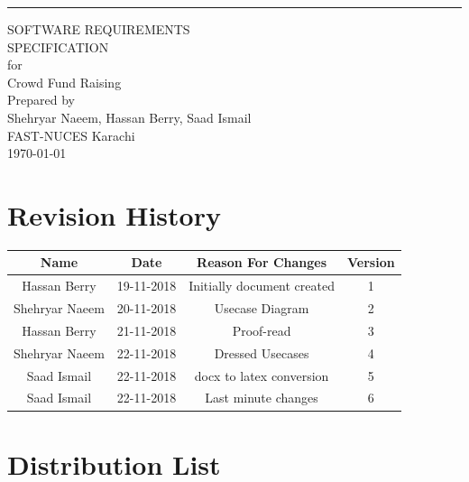 \documentclass{scrreprt}
\date{}
\begin{document}
\begin{flushright}
    \rule{16cm}{5pt}\vskip1cm
    \begin{bfseries}
        \Huge{SOFTWARE REQUIREMENTS\\ SPECIFICATION}\\
        \vspace{1.9cm}
        for\\
        \vspace{1.9cm}
        Crowd Fund Raising\\
        \vspace{1.9cm}
        Prepared by\\Shehryar Naeem, Hassan Berry, Saad Ismail\\
        \vspace{1.9cm}
        FAST-NUCES Karachi\\
        \vspace{1.9cm}
        \today\\
    \end{bfseries}
\end{flushright}

\tableofcontents


\chapter*{Revision History}

\begin{center}
    \begin{tabular}{|c|c|c|c|}
        \hline
	    Name & Date & Reason For Changes & Version\\
        \hline
	    Hassan Berry & 19-11-2018 & Initially document created & 1\\
        \hline
	    Shehryar Naeem & 20-11-2018 & Usecase Diagram & 2\\
        \hline
        Hassan Berry & 21-11-2018 & Proof-read & 3\\
        \hline
        Shehryar Naeem & 22-11-2018 & Dressed Usecases & 4\\
        \hline
        Saad Ismail & 22-11-2018 & docx to latex conversion & 5\\
        \hline
        Saad Ismail & 22-11-2018 & Last minute changes & 6\\
        \hline
    \end{tabular}
\end{center}

\chapter*{Distribution List}
\end{document}
